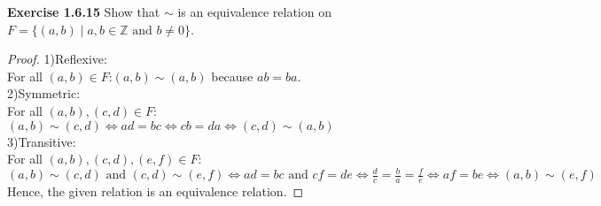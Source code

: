 \documentclass[12pt]{article}
\newcommand{\bbZ}{\mathbb{Z}}
\theoremstyle{definition}
\newtheorem{definition}[theorem]{Definition}
\numberwithin{equation}{subsection}
\begin{document}
\textbf{Exercise 1.6.15} Show that \(\sim\) is an equivalence relation on $F=\{(a, b) \mid a, b \in \bbZ \text{ and } b \neq 0 \} $.
\begin{proof}
1)Reflexive:\\
For all $(a,b) \in F$:\space$(a,b)\sim(a,b)$ because $ab=ba$.\\
2)Symmetric:\\
For all $(a,b), (c,d) \in F$:\space $(a,b)\sim(c,d) \iff ad=bc \iff cb=da \iff (c,d)\sim(a,b)$\\
3)Transitive:\\
For all $(a,b), (c,d),(e,f) \in F$:\space $(a,b)\sim(c,d) \text{ and } (c,d)\sim(e,f) \iff ad=bc \text{ and } cf=de \iff \frac{d}{c}=\frac{b}{a}=\frac{f}{e} \iff af=be \iff (a,b)\sim(e,f)$\\
Hence, the given relation is an equivalence relation.
\end{proof}




\end{document}
